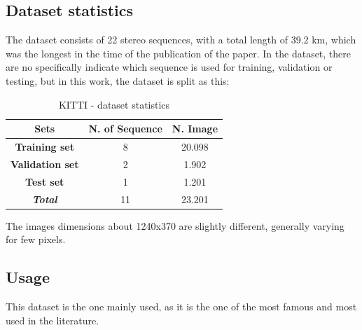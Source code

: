 \subsection{Dataset statistics}\label{subsec:kitti-dataset-statistics}
The dataset consists of 22 stereo sequences, with a total length of 39.2 km, which was the longest in the time of the publication of the paper.
In the dataset, there are no specifically indicate which sequence is used for training, validation or testing, but in this work, the dataset is split as this:
\begin{table}[H]
    \centering
    \begin{tabular}{|c|c|c|}
        \hline
        \textbf{Sets}           & \textbf{N. of Sequence} & \textbf{N. Image} \\ \hline
        \textbf{Training set}   & 8                       & 20.098            \\ \hline
        \textbf{Validation set} & 2                       & 1.902             \\ \hline
        \textbf{Test set}       & 1                       & 1.201             \\ \hline
        \textit{\textbf{Total}} & 11                      & 23.201            \\ \hline
    \end{tabular}\caption{KITTI - dataset statistics}\label{tab:kitti-dataset-statistics}
\end{table}

The images dimensions about 1240x370 are slightly different, generally varying for few pixels.
\subsection{Usage}\label{subsec:kitti-usage}

This dataset is the one mainly used, as it is the one of the most famous and most used in the literature.

